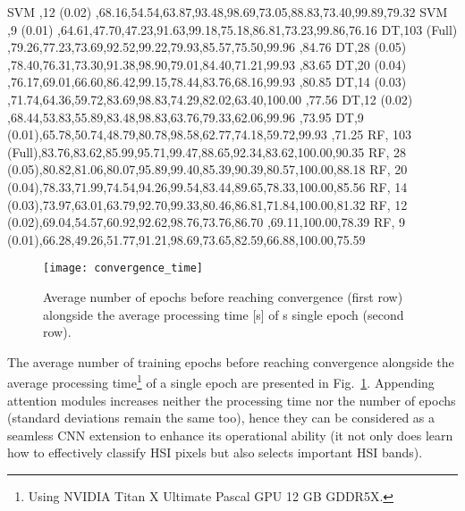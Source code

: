 \documentclass[journal]{IEEEtran}
\begin{document}
\begin{table*}[ht!]
{SVM	,12 (0.02)	,68.16,54.54,63.87,93.48,98.69,73.05,88.83,73.40,99.89,79.32
SVM	,9 (0.01)	,64.61,47.70,47.23,91.63,99.18,75.18,86.81,73.23,99.86,76.16
DT,103 (Full)	,79.26,77.23,73.69,92.52,99.22,79.93,85.57,75.50,99.96	,84.76
DT,28 (0.05)	,78.40,76.31,73.30,91.38,98.90,79.01,84.40,71.21,99.93	,83.65
DT,20 (0.04)	,76.17,69.01,66.60,86.42,99.15,78.44,83.76,68.16,99.93	,80.85
DT,14 (0.03)	,71.74,64.36,59.72,83.69,98.83,74.29,82.02,63.40,100.00	,77.56
DT,12 (0.02)	,68.44,53.83,55.89,83.48,98.83,63.76,79.33,62.06,99.96	,73.95
DT,9 (0.01),65.78,50.74,48.79,80.78,98.58,62.77,74.18,59.72,99.93	,71.25
RF,	103 (Full),83.76,83.62,85.99,95.71,99.47,88.65,92.34,83.62,100.00,90.35
RF,	28 (0.05),80.82,81.06,80.07,95.89,99.40,85.39,90.39,80.57,100.00,88.18
RF,	20 (0.04),78.33,71.99,74.54,94.26,99.54,83.44,89.65,78.33,100.00,85.56
RF,	14 (0.03),73.97,63.01,63.79,92.70,99.33,80.46,86.81,71.84,100.00,81.32
RF,	12 (0.02),69.04,54.57,60.92,92.62,98.76,73.76,86.70 ,69.11,100.00,78.39
RF,	9 (0.01),66.28,49.26,51.77,91.21,98.69,73.65,82.59,66.88,100.00,75.59
}\vrule
\end{table*}

\begin{figure}[ht!]
	\centering
	\texttt{[image: convergence\_time]}
	\caption{Average number of epochs before reaching convergence (first row) alongside the average processing time [s] of s single epoch (second row).}
	\label{fig:convergence_time}
\end{figure}

The average number of training epochs before reaching convergence alongside the average processing time\footnote{Using NVIDIA Titan X Ultimate Pascal GPU 12 GB GDDR5X.} of a single epoch are presented in Fig.~\ref{fig:convergence_time}. Appending attention modules increases neither the processing time nor the number of epochs (standard deviations remain the same too), hence they can be considered as a seamless CNN extension to enhance its operational ability (it not only does learn how to effectively classify HSI pixels but also selects important HSI bands).
\end{document}
